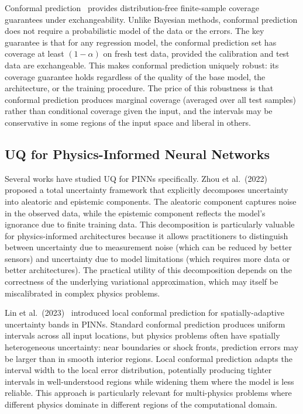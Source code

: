 \documentclass[12pt,a4paper]{article}
\theoremstyle{plain}
\begin{document}
Conformal prediction~\citep{barber2023conformal} provides distribution-free
finite-sample coverage guarantees under exchangeability. Unlike Bayesian
methods, conformal prediction does not require a probabilistic model of the
data or the errors. The key guarantee is that for any regression model,
the conformal prediction set has coverage at least $(1-\alpha)$ on fresh test
data, provided the calibration and test data are exchangeable. This makes
conformal prediction uniquely robust: its coverage guarantee holds
regardless of the quality of the base model, the architecture, or the
training procedure. The price of this robustness is that conformal
prediction produces marginal coverage (averaged over all test samples) rather
than conditional coverage given the input, and the intervals may be
conservative in some regions of the input space and liberal in others.

\subsection{UQ for Physics-Informed Neural Networks}

Several works have studied UQ for PINNs specifically.
Zhou et al.~(2022)~\citep{zhou2022quantifying} proposed a total uncertainty
framework that explicitly decomposes uncertainty into aleatoric and epistemic
components. The aleatoric component captures noise in the observed data, while
the epistemic component reflects the model's ignorance due to finite training
data. This decomposition is particularly valuable for physics-informed
architectures because it allows practitioners to distinguish between
uncertainty due to measurement noise (which can be reduced by better sensors)
and uncertainty due to model limitations (which requires more data or better
architectures). The practical utility of this decomposition depends on the
correctness of the underlying variational approximation, which may itself be
miscalibrated in complex physics problems.

Lin et al.~(2023)~\citep{lin2023uncertainty} introduced local conformal prediction
for spatially-adaptive uncertainty bands in PINNs. Standard conformal prediction
produces uniform intervals across all input locations, but physics problems
often have spatially heterogeneous uncertainty: near boundaries or shock
fronts, prediction errors may be larger than in smooth interior regions.
Local conformal prediction adapts the interval width to the local error
distribution, potentially producing tighter intervals in well-understood
regions while widening them where the model is less reliable. This approach
is particularly relevant for multi-physics problems where different
physics dominate in different regions of the computational domain.
\end{document}
